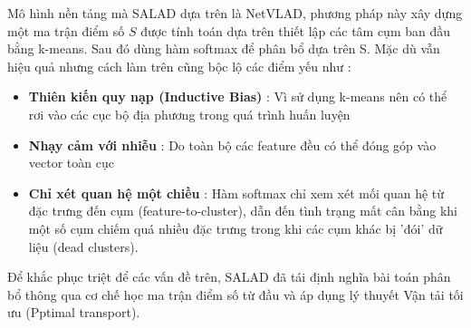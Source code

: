 \documentclass[12pt,a4paper]{article}
\begin{document}
    Mô hình nền tảng mà SALAD dựa trên là NetVLAD, phương pháp này xây dựng một ma trận điểm số $S$ được tính toán dựa trên thiết lập các tâm cụm ban đầu bằng k-means. Sau đó dùng hàm softmax để phân bổ dựa trên S. Mặc dù vẫn hiệu quả nhưng cách làm trên cũng bộc lộ các điểm yếu như :
    \begin{itemize}
        \item \textbf{Thiên kiến quy nạp (Inductive Bias)} : Vì sử dụng k-means nên có thể rơi vào các cục bộ địa phương trong quá trình huấn luyện
        \item \textbf{Nhạy cảm với nhiễu} : Do toàn bộ các feature đều có thể đóng góp vào vector toàn cục
        \item \textbf{Chỉ xét quan hệ một chiều} : Hàm softmax chỉ xem xét mối quan hệ từ đặc trưng đến cụm (feature-to-cluster), dẫn đến tình trạng mất cân bằng khi một số cụm chiếm quá nhiều đặc trưng trong khi các cụm khác bị 'đói' dữ liệu (dead clusters).
    \end{itemize}
    
    Để khắc phục triệt để các vấn đề trên, SALAD đã tái định nghĩa bài toán phân bổ thông qua cơ chế học ma trận điểm số từ đầu và áp dụng lý thuyết Vận tải tối ưu (Pptimal transport).
    
\end{document}
